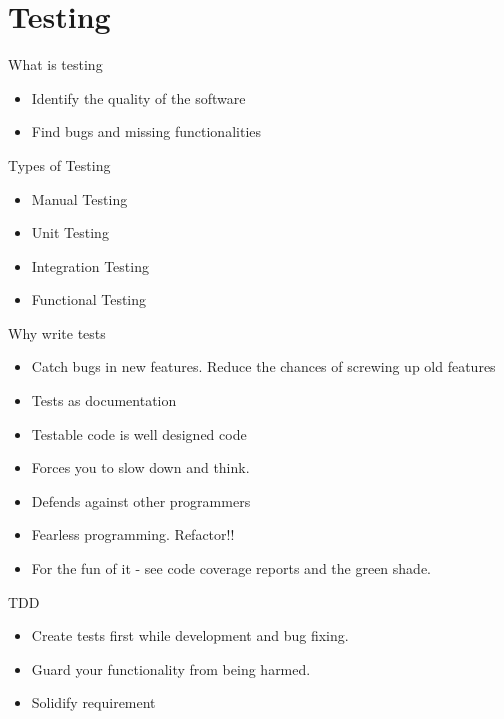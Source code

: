 \section{Testing}

\begin{frame}[fragile]{What is testing}
\begin{itemize}
    \item Identify the quality of the software
    \item Find bugs and missing functionalities
\end{itemize}
\end{frame}

\begin{frame}[fragile]{Types of Testing}
    \pause
    \begin{itemize}
        \item Manual Testing
        \pause
        \item Unit Testing
        \pause
        \item Integration Testing
        \pause
        \item Functional Testing
    \end{itemize}
\end{frame}

\begin{frame}[fragile]{Why write tests}
    \begin{itemize}
        \item Catch bugs in new features. Reduce the chances of screwing up old features
        \pause
        \item Tests as documentation
        \pause
        \item Testable code is well designed code
        \pause
        \item Forces you to slow down and think.
        \pause
        \item Defends against other programmers
        \pause
        \item Fearless programming. Refactor!!
        \pause
        \item For the fun of it - see code coverage reports and the green shade.
    \end{itemize}
\end{frame}

\begin{frame}[fragile]{TDD}
\begin{itemize}
    \item Create tests first while development and bug fixing.
    \item Guard your functionality from being harmed.
    \item Solidify requirement
\end{itemize}
\end{frame}

